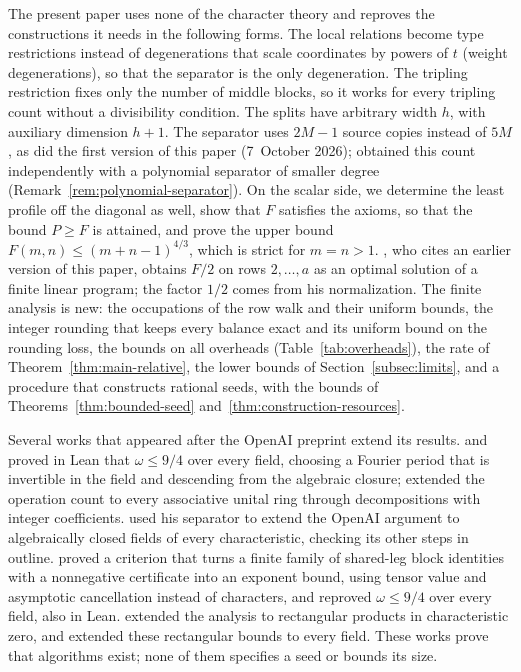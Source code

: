 The present paper uses none of the character theory and reproves the
constructions it needs in the following forms. The local relations
become type restrictions instead of degenerations that scale coordinates
by powers of \(t\) (weight degenerations), so that the separator is the
only degeneration. The tripling restriction fixes only the number of
middle blocks, so it works for every tripling count without a
divisibility condition. The splits have arbitrary width \(h\), with
auxiliary dimension \(h+1\). The separator uses \(2M-1\) source copies
instead of \(5M\), as did the first version of this paper
(7~October 2026); \citet[Proposition~2.1]{Lu26} obtained this count
independently with a polynomial separator of smaller degree
(Remark~\ref{rem:polynomial-separator}). On the scalar
side, we determine the least profile off the diagonal as well, show that
\(F\) satisfies the axioms, so that the bound \(P\ge F\) is attained,
and prove the upper bound \(F(m,n)\le(m+n-1)^{4/3}\), which is strict
for \(m=n>1\). \citet[Section~4.3]{Fil26}, who cites an earlier version
of this paper, obtains \(F/2\) on rows \(2,\ldots,a\) as an optimal
solution of a finite linear program; the factor \(1/2\) comes from his
normalization. The finite
analysis is new: the occupations of the row walk and their uniform
bounds, the integer rounding that keeps every balance exact and its
uniform bound on the rounding loss, the bounds on all overheads
(Table~\ref{tab:overheads}), the rate of
Theorem~\ref{thm:main-relative}, the lower bounds of
Section~\ref{subsec:limits}, and a procedure that constructs rational
seeds, with the bounds of Theorems~\ref{thm:bounded-seed}
and~\ref{thm:construction-resources}.

Several works that appeared after the OpenAI preprint extend its
results. \citet{Nav26a} and \citet{Zui26} proved in Lean that
\(\omega\le9/4\) over every field, choosing a Fourier period that is
invertible in the field and descending from the algebraic closure;
\citet{Nav26b} extended the operation count to every associative unital
ring through decompositions with integer coefficients. \citet{Lu26}
used his separator to extend the OpenAI argument to algebraically closed
fields of every characteristic, checking its other steps in outline.
\citet{Fil26} proved a criterion that turns a
finite family of shared-leg block identities with a nonnegative
certificate into an exponent bound, using tensor value and asymptotic
cancellation instead of characters, and reproved \(\omega\le9/4\) over
every field, also in Lean. \citet{Uzn26} extended the analysis to
rectangular products in characteristic zero, and \citet{Fil26} extended
these rectangular bounds to every field. These works prove
that algorithms exist; none of them specifies a seed or bounds its size.

